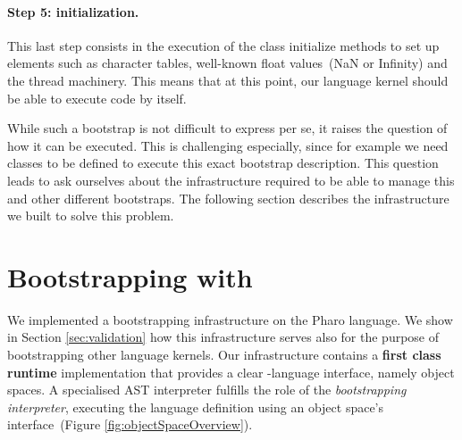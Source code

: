 \paragraph{\textbf{Step 5: initialization.}}
This last step consists in the execution of the class initialize methods to set up elements such as character tables, well-known float values~(\eg NaN or Infinity) and the thread machinery. This means that at this point, our language kernel should be able to execute code by itself.
\newline

While such a bootstrap is not difficult to express per se, it raises the question of how it can be executed. This is challenging especially, since for example we need classes to be defined to execute this exact bootstrap description. This question leads to ask ourselves about the infrastructure required to be able to manage this and other different bootstraps. The following section describes the infrastructure we built to solve this problem.

\section{Bootstrapping with \Vtt}\label{sec:bootstrapping_infrastructure}

We implemented a bootstrapping infrastructure on the Pharo language. We show in Section \ref{sec:validation} how this infrastructure serves also for the purpose of bootstrapping other language kernels. Our infrastructure contains a \textbf{first class runtime} implementation that provides a clear \VM-language interface, namely object spaces. A specialised AST interpreter fulfills the role of the \emph{bootstrapping interpreter}, executing the language definition using an object space's interface~(Figure \ref{fig:objectSpaceOverview}).


